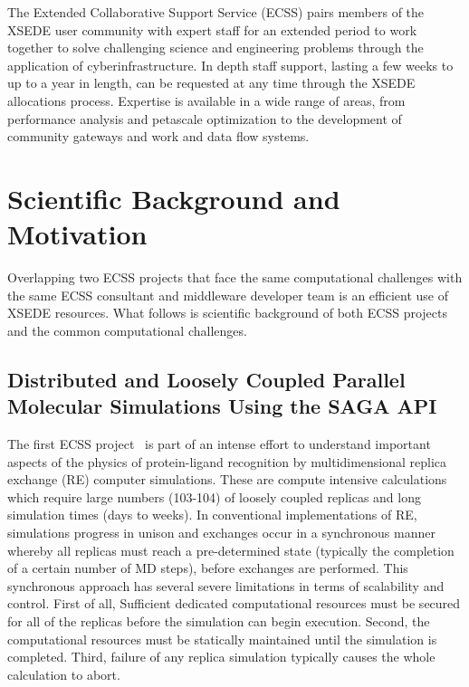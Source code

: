 \documentclass{sig-alternate}
\begin{document}
 

The Extended Collaborative Support Service (ECSS) pairs members of the XSEDE
user community with expert staff for an extended period to work together to
solve challenging science and engineering problems through the application of
cyberinfrastructure. In depth staff support, lasting a few weeks to up to a year
in length, can be requested at any time through the XSEDE allocations process.
Expertise is available in a wide range of areas, from performance analysis and
petascale optimization to the development of community gateways and work and
data flow systems.


\section{Scientific Background and Motivation}

Overlapping two ECSS projects that face the same computational challenges
with the same ECSS consultant and middleware developer team is an efficient
use of XSEDE resources. What follows is scientific background of both ECSS projects
and the common computational challenges.

\subsection{Distributed and Loosely Coupled Parallel Molecular Simulations
Using the SAGA API}
The first ECSS project~\cite{RonLevy} is part of an intense effort to understand
important aspects of the physics of protein-ligand recognition by
multidimensional replica exchange (RE) computer simulations. These are
compute intensive calculations which require large numbers (103-104) of
loosely coupled replicas and long simulation times (days to weeks). In
conventional implementations of RE, simulations progress in unison and
exchanges occur in a synchronous manner whereby all replicas must
reach a pre-determined state (typically the completion of a certain
number of MD steps), before exchanges are performed. This synchronous
approach has several severe limitations in terms of scalability and
control. First of all, Sufficient dedicated computational resources must
be secured for all of the replicas before the simulation can begin
execution. Second, the computational resources must be statically
maintained until the simulation is completed. Third, failure of any
replica simulation typically causes the whole calculation to abort.
\end{document}
